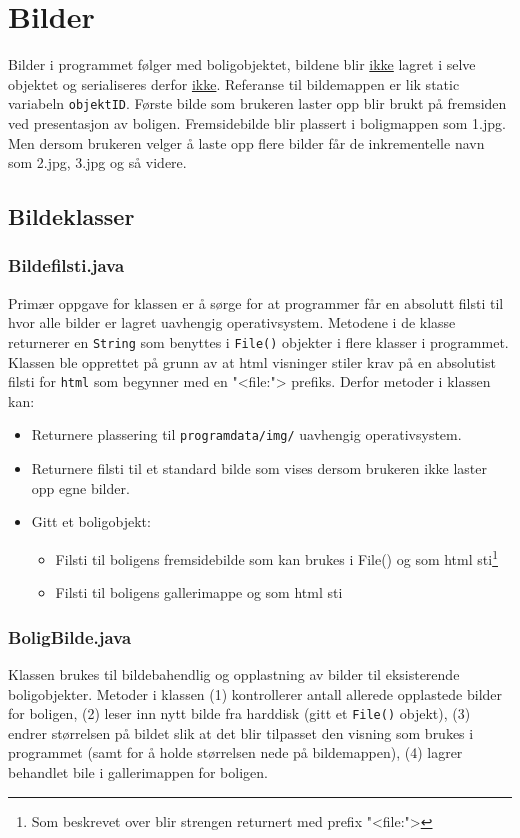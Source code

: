 \section{Bilder} \label{sec:bilder}
Bilder i programmet følger med boligobjektet, bildene blir \underline{ikke} lagret i selve objektet og serialiseres derfor \underline{ikke}. Referanse til bildemappen er lik static variabeln \texttt{objektID}. Første bilde som brukeren laster opp blir brukt på fremsiden ved presentasjon av boligen. Fremsidebilde blir plassert i boligmappen som 1.jpg. Men dersom brukeren velger å laste opp flere bilder får de inkrementelle navn som 2.jpg, 3.jpg og så videre. 

\subsection{Bildeklasser}
\subsubsection*{Bildefilsti.java}
Primær oppgave for klassen er å sørge for at programmer får en absolutt filsti til hvor alle bilder er lagret uavhengig operativsystem. Metodene i de klasse returnerer en \texttt{String} som benyttes i \texttt{File()} objekter i flere klasser i programmet.  
Klassen ble opprettet på grunn av at html visninger stiler krav på en absolutist filsti for \texttt{html} som begynner med en "<file:"> prefiks. 
Derfor metoder i klassen kan: 
\begin{itemize}[noitemsep,nolistsep]
\item Returnere plassering til \texttt{programdata/img/} uavhengig operativsystem.
\item Returnere filsti til et standard bilde som vises dersom brukeren ikke laster opp egne bilder.
\item Gitt et boligobjekt:
\begin{itemize}
\item Filsti til boligens fremsidebilde som kan brukes i File() og som html sti\footnote{Som beskrevet over blir strengen returnert med prefix "<file:">}
\item Filsti til boligens gallerimappe og som html sti
\end{itemize}
\end{itemize}

\subsubsection*{BoligBilde.java}
Klassen brukes til bildebahendlig og opplastning av bilder til eksisterende boligobjekter. Metoder i klassen (1) kontrollerer antall allerede opplastede bilder for boligen, (2) leser inn nytt bilde fra harddisk (gitt et \texttt{File()} objekt), (3) endrer størrelsen på bildet slik at det blir tilpasset den visning som brukes i programmet (samt for å holde størrelsen nede på bildemappen), (4) lagrer behandlet bile i gallerimappen for boligen.

